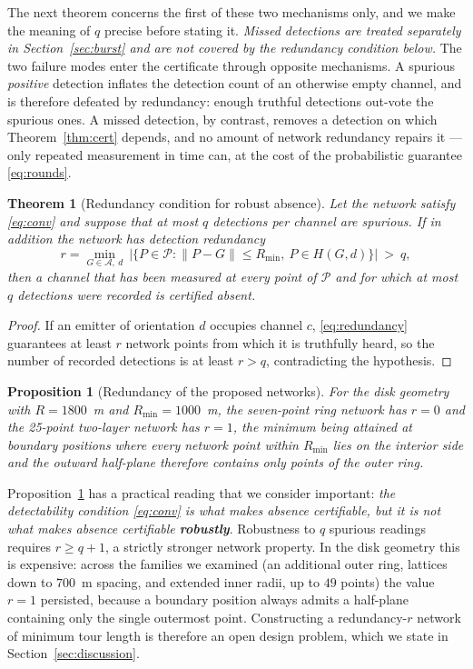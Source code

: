 \documentclass[preprint,12pt,3p]{elsarticle}
\newtheorem{theorem}{Theorem}
\newtheorem{proposition}{Proposition}
\theoremstyle{definition}
\newcommand{\Rmin}{R_{\min}}
\newcommand{\bA}{\mathcal{A}}
\newcommand{\bP}{\mathcal{P}}
\begin{document}
The next theorem concerns the first of these two mechanisms only, and we make the meaning of $q$
precise before stating it. \emph{Missed detections are treated separately in
Section~\ref{sec:burst} and are not covered by the redundancy condition below.} The two failure
modes enter the certificate through opposite mechanisms. A spurious \emph{positive} detection
inflates the detection count of an otherwise empty channel, and is therefore defeated by
redundancy: enough truthful detections out-vote the spurious ones. A missed detection, by
contrast, removes a detection on which Theorem~\ref{thm:cert} depends, and no amount of network
redundancy repairs it --- only repeated measurement in time can, at the cost of the probabilistic
guarantee \eqref{eq:rounds}.

\begin{theorem}[Redundancy condition for robust absence]
\label{thm:redundancy}
Let the network satisfy \eqref{eq:conv} and suppose that at most $q$ detections per channel are
spurious. If in addition the network has \emph{detection redundancy}
\begin{equation}
r=\min_{G\in\bA,\ d}\ \bigl|\{P\in\bP:\|P-G\|\le\Rmin,\ P\in H(G,d)\}\bigr|\ >\ q,
\label{eq:redundancy}
\end{equation}
then a channel that has been measured at every point of $\bP$ and for which at most $q$
detections were recorded is certified absent.
\end{theorem}
\begin{proof}
If an emitter of orientation $d$ occupies channel $c$, \eqref{eq:redundancy} guarantees at least
$r$ network points from which it is truthfully heard, so the number of recorded detections is at
least $r>q$, contradicting the hypothesis.
\end{proof}

\begin{proposition}[Redundancy of the proposed networks]
\label{prop:r1}
For the disk geometry with $R=1800$~m and $\Rmin=1000$~m, the seven-point ring network has $r=0$
and the 25-point two-layer network has $r=1$, the minimum being attained at boundary positions
where every network point within $\Rmin$ lies on the interior side and the outward half-plane
therefore contains only points of the outer ring.
\end{proposition}

Proposition~\ref{prop:r1} has a practical reading that we consider important:
\emph{the detectability condition \eqref{eq:conv} is what makes absence certifiable, but it is not
what makes absence certifiable \textbf{robustly}}. Robustness to $q$ spurious readings requires
$r\ge q+1$, a strictly stronger network property. In the disk geometry this is expensive: across
the families we examined (an additional outer ring, lattices down to $700$~m spacing, and
extended inner radii, up to $49$ points) the value $r=1$ persisted, because a boundary position
always admits a half-plane containing only the single outermost point. Constructing a
redundancy-$r$ network of minimum tour length is therefore an open design problem, which we state
in Section~\ref{sec:discussion}.
\end{document}
